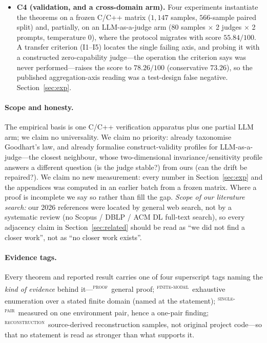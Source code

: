\documentclass{article}
\newcommand{\evtag}[1]{\textsuperscript{\textsc{#1}}}
\begin{document}
\begin{itemize}
  conditional design analysis, not a sample-size requirement for audit studies in general.
  Section~\ref{sec:sample}.
  \item \textbf{C4 (validation, and a cross-domain arm).} Four experiments instantiate the theorems on a
  frozen C/C++ matrix ($1{,}147$ samples, $566$-sample paired split) and, partially, on an LLM-as-a-judge arm
  ($80$ samples $\times$ 2 judges $\times$ 2 prompts, temperature $0$), where the protocol migrates with score
  $55.84/100$. A transfer criterion (I1--I5) locates the single failing axis, and probing it with a
  constructed zero-capability judge---the operation the criterion says was never performed---raises the score
  to $78.26/100$ (conservative $73.26$), so the published aggregation-axis reading was a test-design false
  negative. Section~\ref{sec:exp}.
\end{itemize}

\paragraph{Scope and honesty.} The empirical basis is one C/C++ verification apparatus plus one partial LLM
arm; we claim no universality. We claim no priority: \citet{manheim2018categorizing} already taxonomise
Goodhart's law, and \citet{chen2026judge} already formalise construct-validity profiles for
LLM-as-a-judge---the closest neighbour, whose two-dimensional invariance/sensitivity profile answers a
different question (is the judge stable?) from ours (can the drift be repaired?). We claim no new
measurement: every number in Section~\ref{sec:exp} and the appendices was computed in an earlier batch from
a frozen matrix. Where a proof is incomplete we say so rather than fill the gap.
\emph{Scope of our literature search:} our 2026 references were located by general web search,
not by a systematic review (no Scopus / DBLP / ACM DL full-text search), so every adjacency
claim in Section~\ref{sec:related} should be read as ``we did not find a closer work'', not as
``no closer work exists''.

\paragraph{Evidence tags.} Every theorem and reported result carries one of four superscript tags naming
the \emph{kind of evidence} behind it---\evtag{proof}~general proof; \evtag{finite-model}~exhaustive
enumeration over a stated finite domain (named at the statement); \evtag{single-pair}~measured on one
environment pair, hence a one-pair finding; \evtag{reconstruction}~source-derived reconstruction samples,
not original project code---so that no statement is read as stronger than what supports it.
\end{document}
